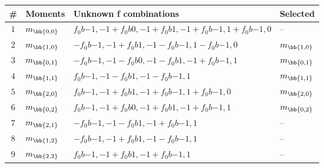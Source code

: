 \begin{table}[!h]
\centering
\begin{tabular}{c l l l}
\toprule
\# & Moments & Unknown f combinations & Selected\\
\midrule
\multirow{ 1}{*}{$1$} & \multirow{ 1}{*}{$m_\bb{0,0}$} & $f_0b{-1,-1}+f_0b{0,-1}+f_0b{1,-1}+f_0b{-1,1}+f_0b{-1,0}$ & \multirow{ 1}{*}{--}\\ 
\midrule
\multirow{ 1}{*}{$2$} & \multirow{ 1}{*}{$m_\bb{1,0}$} & $-f_0b{-1,-1}+f_0b{1,-1}-f_0b{-1,1}-f_0b{-1,0}$ & \multirow{ 1}{*}{$m_\bb{1,0}$}\\ 
\midrule
\multirow{ 1}{*}{$3$} & \multirow{ 1}{*}{$m_\bb{0,1}$} & $-f_0b{-1,-1}-f_0b{0,-1}-f_0b{1,-1}+f_0b{-1,1}$ & \multirow{ 1}{*}{$m_\bb{0,1}$}\\ 
\midrule
\multirow{ 1}{*}{$4$} & \multirow{ 1}{*}{$m_\bb{1,1}$} & $f_0b{-1,-1}-f_0b{1,-1}-f_0b{-1,1}$ & \multirow{ 1}{*}{$m_\bb{1,1}$}\\ 
\midrule
\multirow{ 1}{*}{$5$} & \multirow{ 1}{*}{$m_\bb{2,0}$} & $f_0b{-1,-1}+f_0b{1,-1}+f_0b{-1,1}+f_0b{-1,0}$ & \multirow{ 1}{*}{$m_\bb{2,0}$}\\ 
\midrule
\multirow{ 1}{*}{$6$} & \multirow{ 1}{*}{$m_\bb{0,2}$} & $f_0b{-1,-1}+f_0b{0,-1}+f_0b{1,-1}+f_0b{-1,1}$ & \multirow{ 1}{*}{$m_\bb{0,2}$}\\ 
\midrule
\multirow{ 1}{*}{$7$} & \multirow{ 1}{*}{$m_\bb{2,1}$} & $-f_0b{-1,-1}-f_0b{1,-1}+f_0b{-1,1}$ & \multirow{ 1}{*}{--}\\ 
\midrule
\multirow{ 1}{*}{$8$} & \multirow{ 1}{*}{$m_\bb{1,2}$} & $-f_0b{-1,-1}+f_0b{1,-1}-f_0b{-1,1}$ & \multirow{ 1}{*}{--}\\ 
\midrule
\multirow{ 1}{*}{$9$} & \multirow{ 1}{*}{$m_\bb{2,2}$} & $f_0b{-1,-1}+f_0b{1,-1}+f_0b{-1,1}$ & \multirow{ 1}{*}{--}\\ 
\bottomrule
\end{tabular}\end{table}
